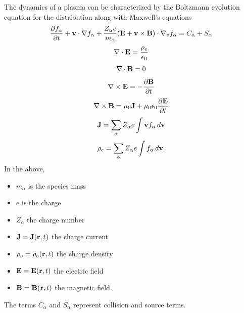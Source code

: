 \documentclass[oneside,a4paper,11pt]{report}
\begin{document}
The dynamics of a plasma can be characterized by the Boltzmann evolution equation for the distribution along with Maxwell's equations
\begin{equation}
\label{eq:kinetic_equation}
\frac{\partial f_\alpha}{\partial t} + \mathbf{v} \cdot \nabla f_\alpha + \frac{Z_\alpha e}{m_\alpha} ( \mathbf{E} + \mathbf{v} \times \mathbf{B} ) \cdot \nabla_v f_\alpha = C_\alpha + S_\alpha
\end{equation}
\begin{equation}
\label{eq:maxwell_3}
\nabla \cdot \mathbf{E} = \frac{\rho_e}{\epsilon_0} 
\end{equation}
\begin{equation}
\label{eq:maxwell_4}
\nabla \cdot \mathbf{B} = 0
\end{equation}
\begin{equation}
\label{eq:maxwell_1}
\nabla \times \mathbf{E} = -\frac{ \partial \mathbf{B}}{\partial t}
\end{equation}
\begin{equation}
\label{eq:maxwell_2}
\nabla \times \mathbf{B} = \mu_0 \mathbf{J} + \mu_0 \epsilon_0 \frac{\partial \mathbf{E}}{\partial t}
\end{equation}
\begin{equation}
\mathbf{J} = \sum_\alpha Z_\alpha e \int \mathbf{v} f_\alpha \, d\mathbf{v}
\end{equation}
\begin{equation}
\rho_e = \sum_\alpha Z_\alpha e \int f_\alpha \, d\mathbf{v}.
\end{equation}
In the above, 
\begin{itemize}
\item $m_\alpha$ is the species mass
\item $e$ is the charge
\item $Z_\alpha$ the charge number
\item $\mathbf{J} = \mathbf{J}(\mathbf{r},t)$ the charge current
\item $\rho_e = \rho_e(\mathbf{r},t)$ the charge density
\item $\mathbf{E} = \mathbf{E}(\mathbf{r},t)$ the electric field
\item $\mathbf{B} = \mathbf{B}(\mathbf{r},t)$ the magnetic field.
\end{itemize}
The terms $C_\alpha$ and $S_\alpha$ represent collision and source terms.
\end{document}
